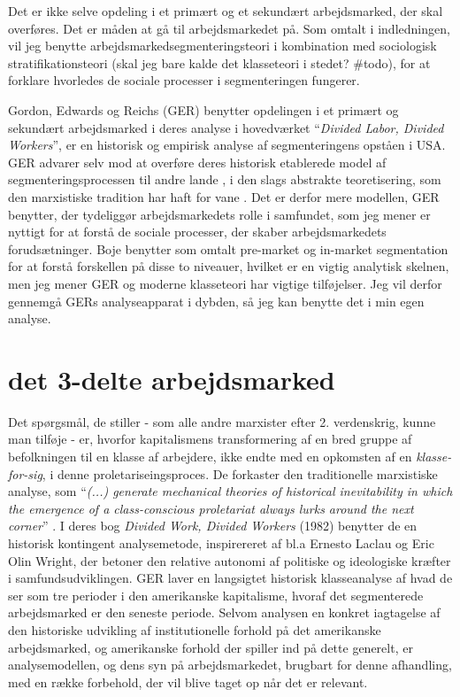Det er ikke selve opdeling i et primært og et sekundært arbejdsmarked, der skal overføres. Det er måden at gå til arbejdsmarkedet på. Som omtalt i indledningen, vil jeg benytte arbejdsmarkedsegmenteringsteori i kombination med sociologisk stratifikationsteori (skal jeg bare kalde det klasseteori i stedet? \#todo), for at forklare hvorledes de sociale processer i segmenteringen fungerer.  

Gordon, Edwards og Reichs (GER) benytter opdelingen i et primært og sekundært arbejdsmarked i deres analyse i hovedværket “\emph{Divided Labor, Divided Workers}”, er en historisk og empirisk analyse af segmenteringens opståen i USA. GER advarer selv mod at overføre deres historisk etablerede model af segmenteringsprocessen til andre lande , i den slags abstrakte teoretisering, som den marxistiske tradition har haft for vane \parencite[21]{Gordon1982}. Det er derfor mere modellen, GER benytter, der tydeliggør arbejdsmarkedets rolle i samfundet, som jeg mener er nyttigt for at forstå de sociale processer, der skaber arbejdsmarkedets forudsætninger. 
Boje benytter som omtalt pre-market og in-market segmentation for at forstå forskellen på disse to niveauer, hvilket er en vigtig analytisk skelnen, men jeg mener GER og moderne klasseteori har vigtige tilføjelser. Jeg vil derfor gennemgå GERs analyseapparat i dybden, så jeg kan benytte det i min egen analyse. 




\section{det 3-delte arbejdsmarked \label{AST_tredeltGER}}


Det spørgsmål, de stiller - som alle andre marxister efter 2. verdenskrig, kunne man tilføje - er, hvorfor kapitalismens transformering af en bred gruppe af befolkningen til en klasse af arbejdere, ikke endte med en opkomsten af en \emph{klasse-for-sig}, i denne proletariseingsproces.  De forkaster den traditionelle marxistiske analyse, som “\emph{(...) generate mechanical theories of historical inevitability in which the emergence of a class-conscious proletariat always lurks around the next corner}” \parencite[21]{Gordon1982}. I deres bog \emph{Divided Work, Divided Workers} (1982) benytter de en historisk kontingent analysemetode, inspirereret af bl.a Ernesto Laclau og Eric Olin Wright, der betoner den relative autonomi af politiske og ideologiske kræfter i samfundsudviklingen. GER laver en langsigtet historisk klasseanalyse af hvad de ser som tre perioder i den amerikanske kapitalisme, hvoraf det segmenterede arbejdsmarked er den seneste periode. Selvom analysen en konkret iagtagelse af den historiske udvikling af institutionelle forhold på det amerikanske arbejdsmarked, og amerikanske forhold der spiller ind på dette generelt, er analysemodellen, og dens syn på arbejdsmarkedet, brugbart for denne afhandling, med en række forbehold, der vil blive taget op når det er relevant. 

